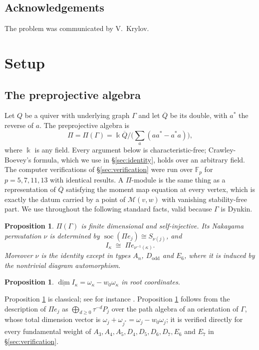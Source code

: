 \documentclass[11pt,reqno]{amsart}
\theoremstyle{plain}
\newtheorem{proposition}[theorem]{Proposition}
\theoremstyle{definition}
\DeclareMathOperator{\soc}{soc}
\newcommand{\Pia}{\Pi}
\newcommand{\dimv}{\underline{\dim}}
\newcommand{\om}{\omega}
\newcommand{\ka}{\kappa}
\newcommand{\Mvw}{\mathcal{M}}
\begin{document}
\subsection{Acknowledgements}
The problem was communicated by V.~Krylov.

\section{Setup}\label{sec:setup}

\subsection{The preprojective algebra}
Let $Q$ be a quiver with underlying graph $\Gamma$ and let $\overline{Q}$ be its
double, with $a^*$ the reverse of $a$.  The preprojective algebra is
\[
  \Pia=\Pia(\Gamma)=\Bbbk\overline{Q}\Big/\Big(\textstyle\sum_{a}(aa^*-a^*a)\Big),
\]
where $\Bbbk$ is any field.  Every argument below is characteristic-free;
Crawley-Boevey's formula, which we use in \S\ref{sec:identity}, holds over an
arbitrary field.  The computer verifications of \S\ref{sec:verification} were
run over $\mathbb{F}_p$ for $p=5,7,11,13$ with identical results.
A $\Pia$-module is the same thing as a representation of $\overline{Q}$
satisfying the moment map equation at every vertex, which is exactly the datum
carried by a point of $\Mvw(v,w)$ with vanishing stability-free part.  We use
throughout the following standard facts, valid because $\Gamma$ is Dynkin.

\begin{proposition}\label{prop:selfinj}
$\Pia(\Gamma)$ is finite dimensional and self-injective.  Its Nakayama
permutation $\nu$ is determined by $\soc(\Pia e_j)\cong S_{\nu(j)}$, and
\[
  I_\ka \;\cong\; \Pia e_{\nu^{-1}(\ka)} .
\]
Moreover $\nu$ is the identity except in types $A_n$, $D_{\text{odd}}$ and
$E_6$, where it is induced by the nontrivial diagram automorphism.
\end{proposition}

\begin{proposition}\label{prop:dimI}
$\dimv I_\ka=\om_\ka-w_0\om_\ka$ in root coordinates.
\end{proposition}

Proposition \ref{prop:selfinj} is classical; see for instance
\cite[\S1]{CB}.  Proposition \ref{prop:dimI} follows from the description of
$\Pia e_j$ as $\bigoplus_{d\ge0}\tau^{-d}P_j$ over the path algebra of an
orientation of $\Gamma$, whose total dimension vector is
$\om_j+\om_{j^*}=\om_j-w_0\om_j$; it is verified directly for every fundamental
weight of $A_3,A_4,A_5,D_4,D_5,D_6,D_7,E_6$ and $E_7$ in
\S\ref{sec:verification}.
\end{document}
